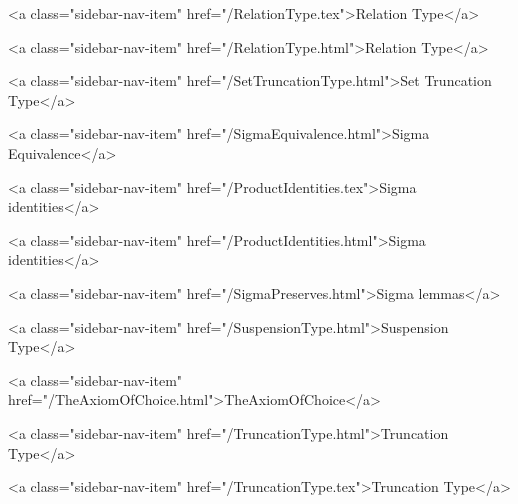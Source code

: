       
    
      
        
          <a class="sidebar-nav-item" href="/RelationType.tex">Relation Type</a>
        
      
    
      
        
          <a class="sidebar-nav-item" href="/RelationType.html">Relation Type</a>
        
      
    
      
        
          <a class="sidebar-nav-item" href="/SetTruncationType.html">Set Truncation Type</a>
        
      
    
      
        
          <a class="sidebar-nav-item" href="/SigmaEquivalence.html">Sigma Equivalence</a>
        
      
    
      
        
          <a class="sidebar-nav-item" href="/ProductIdentities.tex">Sigma identities</a>
        
      
    
      
        
          <a class="sidebar-nav-item" href="/ProductIdentities.html">Sigma identities</a>
        
      
    
      
        
          <a class="sidebar-nav-item" href="/SigmaPreserves.html">Sigma lemmas</a>
        
      
    
      
        
          <a class="sidebar-nav-item" href="/SuspensionType.html">Suspension Type</a>
        
      
    
      
        
          <a class="sidebar-nav-item" href="/TheAxiomOfChoice.html">TheAxiomOfChoice</a>
        
      
    
      
        
          <a class="sidebar-nav-item" href="/TruncationType.html">Truncation Type</a>
        
      
    
      
        
          <a class="sidebar-nav-item" href="/TruncationType.tex">Truncation Type</a>
        
